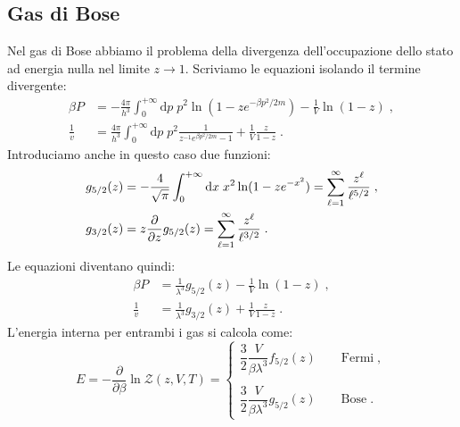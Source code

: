 \documentclass[10pt,a4paper]{report}
\theoremstyle{definition}
\numberwithin{equation}{section}
\newcommand{\diff}[1][]{\mathrm{d}#1}
\newcommand{\zpart}{\mathcal{Z}}
\begin{document}
\subsection{Gas di Bose}
Nel gas di Bose abbiamo il problema della divergenza dell'occupazione dello stato ad energia nulla nel limite $z\to 1$. Scriviamo le equazioni isolando il termine divergente:
\begin{align*}
\beta P&=-\frac{4\pi}{h^3}\int_0^{+\infty}\diff{p}\;p^2\ln(1-ze^{-\beta p^2/2m})-\frac{1}{V}\ln(1-z)\;, \\
\frac{1}{v}&= \frac{4\pi}{h^3}\int_0^{+\infty}\diff{p}\; p^2\frac{1}{z^{-1}e^{\beta p^2/2m}-1}+\frac{1}{V}\frac{z}{1-z}\;.
\end{align*}
Introduciamo anche in questo caso due funzioni:
\begin{align}
g_{5/2}(z)&=-\frac{4}{\sqrt{\pi}}\int_0^{+\infty}\diff{x}\;x^2\ln(1-ze^{-x^2})=\sum_{\ell=1}^{\infty}\frac{z^{\ell}}{\ell^{5/2}}\;, \notag \\
g_{3/2}(z)&=z\frac{\partial}{\partial z}g_{5/2}(z)=\sum_{\ell=1}^{\infty}\frac{z^{\ell}}{\ell^{3/2}}\;.
\end{align}
Le equazioni diventano quindi:
\begin{align}
\beta P &= \frac{1}{\lambda^3}g_{5/2}(z)-\frac{1}{V}\ln(1-z)\;, \\
\frac{1}{v}&=\frac{1}{\lambda^3}g_{3/2}(z)+\frac{1}{V}\frac{z}{1-z}\;.
\end{align}
L'energia interna per entrambi i gas si calcola come:
\begin{equation}
E=-\frac{\partial}{\partial\beta}\ln\zpart(z,V,T)=\begin{cases}
\dfrac{3}{2}\dfrac{V}{\beta\lambda^3}f_{5/2}(z)\qquad \mbox{Fermi}\;, \\
\\
\dfrac{3}{2}\dfrac{V}{\beta\lambda^3}g_{5/2}(z)\qquad \mbox{Bose}\;.
\end{cases}
\end{equation}
\end{document}
